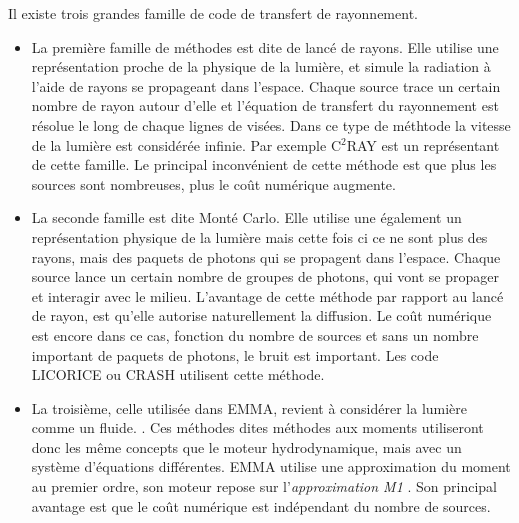 Il existe trois grandes famille de code de transfert de rayonnement.
\begin{itemize}

\item La première famille de méthodes est dite de lancé de rayons.
Elle utilise une représentation proche de la physique de la lumière, et simule la radiation à l'aide de rayons se propageant dans l'espace.
Chaque source trace un certain nombre de rayon autour d'elle et l'équation de transfert du rayonnement est résolue le long de chaque lignes de visées.
Dans ce type de méthtode la vitesse de la lumière est considérée infinie.
Par exemple C$^2$RAY\citep{2006NewA...11..374M} est un représentant de cette famille.
Le principal inconvénient de cette méthode est que plus les sources sont nombreuses, plus le coût numérique augmente.

\item La seconde famille est dite Monté Carlo.
Elle utilise une également un représentation physique de la lumière mais cette fois ci ce ne sont plus des rayons, mais des paquets de photons qui se propagent dans l'espace.
Chaque source lance un certain nombre de groupes de photons, qui vont se propager et interagir avec le milieu.
L'avantage de cette méthode par rapport au lancé de rayon, est qu'elle autorise naturellement la diffusion.
Le coût numérique est encore dans ce cas, fonction du nombre de sources et sans un nombre important de paquets de photons, le bruit est important.
Les code LICORICE \citep{semelin_lyman-alpha_2007} ou CRASH \citep{2003MNRAS.345..379M} utilisent cette méthode.

\item La troisième, celle utilisée dans EMMA, revient à considérer la lumière comme un fluide. \citep{gnedin_multi-dimensional_2001, aubert_radiative_2008}.
Ces méthodes dites méthodes aux moments utiliseront donc les même concepts que le moteur hydrodynamique, mais avec un système d'équations différentes. 
EMMA utilise une approximation du moment au premier ordre, son moteur repose sur l'\textit{approximation M1} \citep{levermore_relating_1984}.
Son principal avantage est que le coût numérique est indépendant du nombre de sources.
\end{itemize}


